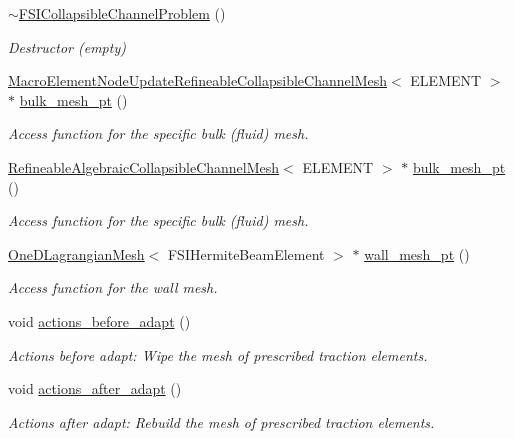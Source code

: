\begin{DoxyCompactItemize}
\hyperlink{classFSICollapsibleChannelProblem_abe33aaaae15ea3eb10885527a1d1ad9a}{$\sim$\+F\+S\+I\+Collapsible\+Channel\+Problem} ()
\begin{DoxyCompactList}\small\item\em Destructor (empty) \end{DoxyCompactList}\item 
\hyperlink{classoomph_1_1MacroElementNodeUpdateRefineableCollapsibleChannelMesh}{Macro\+Element\+Node\+Update\+Refineable\+Collapsible\+Channel\+Mesh}$<$ E\+L\+E\+M\+E\+NT $>$ $\ast$ \hyperlink{classFSICollapsibleChannelProblem_a6c031288ea229296c10e5f41c7b3e99e}{bulk\+\_\+mesh\+\_\+pt} ()
\begin{DoxyCompactList}\small\item\em Access function for the specific bulk (fluid) mesh. \end{DoxyCompactList}\item 
\hyperlink{classoomph_1_1RefineableAlgebraicCollapsibleChannelMesh}{Refineable\+Algebraic\+Collapsible\+Channel\+Mesh}$<$ E\+L\+E\+M\+E\+NT $>$ $\ast$ \hyperlink{classFSICollapsibleChannelProblem_afa3825057e5875deda297c68eb893f74}{bulk\+\_\+mesh\+\_\+pt} ()
\begin{DoxyCompactList}\small\item\em Access function for the specific bulk (fluid) mesh. \end{DoxyCompactList}\item 
\hyperlink{classoomph_1_1OneDLagrangianMesh}{One\+D\+Lagrangian\+Mesh}$<$ F\+S\+I\+Hermite\+Beam\+Element $>$ $\ast$ \hyperlink{classFSICollapsibleChannelProblem_ae8b71da8da82f3c52387052ce400b930}{wall\+\_\+mesh\+\_\+pt} ()
\begin{DoxyCompactList}\small\item\em Access function for the wall mesh. \end{DoxyCompactList}\item 
void \hyperlink{classFSICollapsibleChannelProblem_a91b30b3d0369c178d3a79f5658644f1b}{actions\+\_\+before\+\_\+adapt} ()
\begin{DoxyCompactList}\small\item\em Actions before adapt\+: Wipe the mesh of prescribed traction elements. \end{DoxyCompactList}\item 
void \hyperlink{classFSICollapsibleChannelProblem_ae20eb7ed895e0063ade5a6d0c6f9af2f}{actions\+\_\+after\+\_\+adapt} ()
\begin{DoxyCompactList}\small\item\em Actions after adapt\+: Rebuild the mesh of prescribed traction elements. \end{DoxyCompactList}\item 

\end{DoxyCompactItemize}
